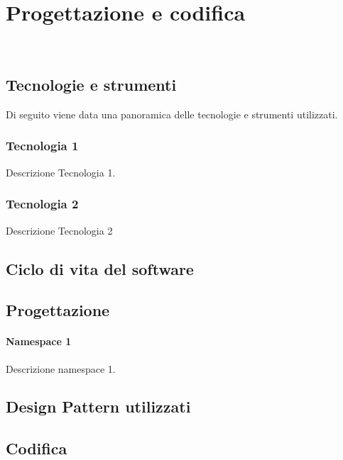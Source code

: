 
\chapter{Progettazione e codifica}
\label{cap:capitolo5}

\\

\section{Tecnologie e strumenti}
\label{sec:tecnologie-strumenti}

Di seguito viene data una panoramica delle tecnologie e strumenti utilizzati.

\subsection*{Tecnologia 1}
Descrizione Tecnologia 1.

\subsection*{Tecnologia 2}
Descrizione Tecnologia 2

\section{Ciclo di vita del software}
\label{sec:ciclo-vita-software}

\section{Progettazione}
\label{sec:progettazione}

\subsubsection{Namespace 1} %
Descrizione namespace 1.

\begin{namespacedesc}
\end{namespacedesc}


\section{Design Pattern utilizzati}

\section{Codifica}
